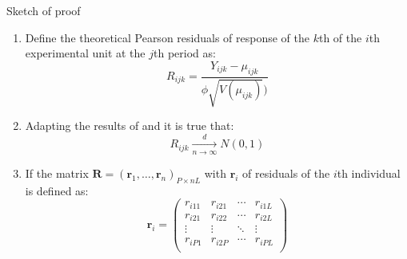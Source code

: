 \documentclass[t,9pt]{beamer}
\begin{document}
\begin{frame}[fragile]{Sketch of proof}
\begin{enumerate}
    \item Define the theoretical Pearson residuals of response of the $k$th of the $i$th experimental unit at the $j$th period as:
\begin{equation}\nonumber
    R_{ijk}=\frac{Y_{ijk}-\mu_{ijk}}{{\phi}\sqrt{V(\mu_{ijk})})}
\end{equation}
\item Adapting the results of \cite{cox1968general} and \cite{cordeiro2004Pearson} it is true that:
\begin{equation}\nonumber
    R_{ijk}\xrightarrow[n\to \infty]{d} N(0,1)
\end{equation}
\item If the matrix  $\pmb{R}=(\pmb{r}_1,\ldots, \pmb{r}_n)_{P\times nL}$ with $\pmb{r}_i$ of residuals of the $i$th individual is defined as:
\begin{equation}\nonumber
      \pmb{r}_i=\begin{pmatrix}
    r_{i11}& r_{i21}& \cdots& r_{i1L}\\
    r_{i21}& r_{i22}& \cdots &r_{i2L}\\
    \vdots& \vdots& \ddots& \vdots\\
    r_{iP1}& r_{i2P}& \cdots &r_{iPL}\\
    \end{pmatrix}
    \end{equation}
\end{enumerate}
\end{frame}
\end{document}
